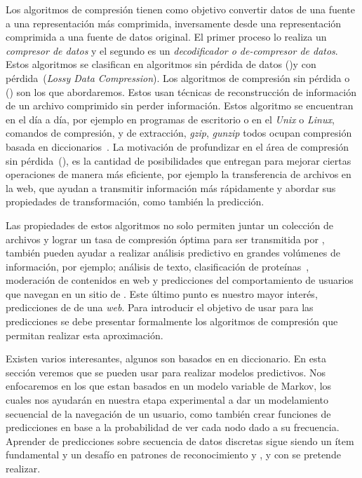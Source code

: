 Los algoritmos de compresión tienen como objetivo convertir datos de una fuente a una representación más comprimida, inversamente desde una representación comprimida a una fuente de datos original. El primer proceso lo realiza un \emph{compresor de datos} y el segundo es un \emph{decodificador o de-compresor de datos}. Estos algoritmos se clasifican en algoritmos sin pérdida de datos (\losslessdatacompression)y con pérdida~(\emph{Lossy Data Compression}). Los algoritmos de compresión sin pérdida o  \losslessdatacompression(\LDC) son los que abordaremos. Estos usan técnicas de reconstrucción de información de un archivo comprimido sin perder información. Estos algoritmo se encuentran en el día a día, por ejemplo en programas de escritorio o en el \emph{Unix} o \emph{Linux}, comandos de compresión, y de extracción, \emph{gzip}, \emph{gunzip} todos ocupan compresión basada en diccionarios~\cite{MengyiPu2006}. La motivación de profundizar en el área de compresión sin pérdida~(\LDC), es la cantidad de posibilidades que entregan para mejorar ciertas operaciones de manera más eficiente, por ejemplo la  transferencia de archivos en la web, que ayudan a transmitir información más rápidamente y abordar sus propiedades de transformación, como también la predicción.


Las propiedades de estos algoritmos no solo permiten juntar un colección de archivos y lograr un tasa de compresión óptima para ser transmitida por \inet, también pueden ayudar a realizar análisis predictivo en grandes volúmenes de información, por ejemplo; análisis de texto, clasificación de proteínas~\cite{}, moderación de contenidos en web y predicciones del comportamiento de usuarios que navegan en un sitio de \inet. Este último punto es nuestro mayor interés, predicciones de \webasccesslog de una \emph{web}. Para introducir el objetivo de usar \LDC para las predicciones se debe presentar formalmente los algoritmos de compresión que permitan realizar esta aproximación.

Existen varios \losslessdatacompression interesantes, algunos son basados en en diccionario. En esta sección veremos que se pueden usar para realizar modelos predictivos. Nos enfocaremos en los que estan basados en un modelo variable de Markov, los cuales nos ayudarán en nuestra etapa experimental a dar un modelamiento secuencial de la navegación de un usuario, como también crear funciones de predicciones en base a la probabilidad de ver cada nodo dado a su frecuencia. Aprender de predicciones sobre secuencia de datos discretas sigue siendo un ítem fundamental y un desafío en patrones de reconocimiento y \machinelearning, y con \LDC se pretende realizar.














